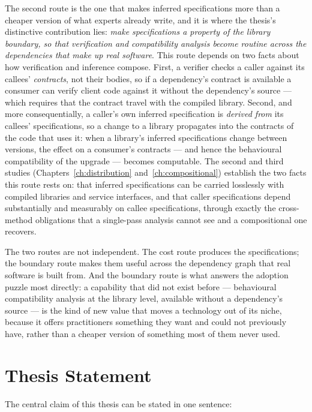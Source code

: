The second route is the one that makes inferred specifications more than a
cheaper version of what experts already write, and it is where the thesis's
distinctive contribution lies: \emph{make specifications a property of the
library boundary, so that verification and compatibility analysis become routine
across the dependencies that make up real software}. This route depends on two
facts about how verification and inference compose. First, a verifier checks a
caller against its callees' \emph{contracts}, not their bodies, so if a
dependency's contract is available a consumer can verify client code against it
without the dependency's source --- which requires that the contract travel with
the compiled library. Second, and more consequentially, a caller's own inferred
specification is \emph{derived from} its callees' specifications, so a change to a
library propagates into the contracts of the code that uses it: when a library's
inferred specifications change between versions, the effect on a consumer's
contracts --- and hence the behavioural compatibility of the upgrade --- becomes
computable. The second and third studies (Chapters~\ref{ch:distribution}
and~\ref{ch:compositional}) establish the two facts this route rests on: that
inferred specifications can be carried losslessly with compiled libraries and
service interfaces, and that caller specifications depend substantially and
measurably on callee specifications, through exactly the cross-method obligations
that a single-pass analysis cannot see and a compositional one recovers.

The two routes are not independent. The cost route produces the specifications;
the boundary route makes them useful across the dependency graph that real
software is built from. And the boundary route is what answers the adoption
puzzle most directly: a capability that did not exist before --- behavioural
compatibility analysis at the library level, available without a dependency's
source --- is the kind of new value that moves a technology out of its niche,
because it offers practitioners something they want and could not previously
have, rather than a cheaper version of something most of them never used.

\section{Thesis Statement}

The central claim of this thesis can be stated in one sentence:

